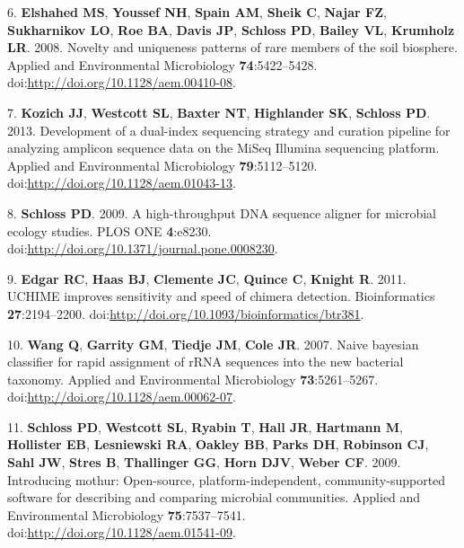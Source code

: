 \documentclass[11pt,]{article}
\begin{document}
6. \textbf{Elshahed MS}, \textbf{Youssef NH}, \textbf{Spain AM},
\textbf{Sheik C}, \textbf{Najar FZ}, \textbf{Sukharnikov LO},
\textbf{Roe BA}, \textbf{Davis JP}, \textbf{Schloss PD}, \textbf{Bailey
VL}, \textbf{Krumholz LR}. 2008. Novelty and uniqueness patterns of rare
members of the soil biosphere. Applied and Environmental Microbiology
\textbf{74}:5422--5428. doi:\url{http://doi.org/10.1128/aem.00410-08}.

7. \textbf{Kozich JJ}, \textbf{Westcott SL}, \textbf{Baxter NT},
\textbf{Highlander SK}, \textbf{Schloss PD}. 2013. Development of a
dual-index sequencing strategy and curation pipeline for analyzing
amplicon sequence data on the MiSeq Illumina sequencing platform.
Applied and Environmental Microbiology \textbf{79}:5112--5120.
doi:\url{http://doi.org/10.1128/aem.01043-13}.

8. \textbf{Schloss PD}. 2009. A high-throughput DNA sequence aligner for
microbial ecology studies. PLOS ONE \textbf{4}:e8230.
doi:\url{http://doi.org/10.1371/journal.pone.0008230}.

9. \textbf{Edgar RC}, \textbf{Haas BJ}, \textbf{Clemente JC},
\textbf{Quince C}, \textbf{Knight R}. 2011. UCHIME improves sensitivity
and speed of chimera detection. Bioinformatics \textbf{27}:2194--2200.
doi:\url{http://doi.org/10.1093/bioinformatics/btr381}.

10. \textbf{Wang Q}, \textbf{Garrity GM}, \textbf{Tiedje JM},
\textbf{Cole JR}. 2007. Naive bayesian classifier for rapid assignment
of rRNA sequences into the new bacterial taxonomy. Applied and
Environmental Microbiology \textbf{73}:5261--5267.
doi:\url{http://doi.org/10.1128/aem.00062-07}.

11. \textbf{Schloss PD}, \textbf{Westcott SL}, \textbf{Ryabin T},
\textbf{Hall JR}, \textbf{Hartmann M}, \textbf{Hollister EB},
\textbf{Lesniewski RA}, \textbf{Oakley BB}, \textbf{Parks DH},
\textbf{Robinson CJ}, \textbf{Sahl JW}, \textbf{Stres B},
\textbf{Thallinger GG}, \textbf{Horn DJV}, \textbf{Weber CF}. 2009.
Introducing mothur: Open-source, platform-independent,
community-supported software for describing and comparing microbial
communities. Applied and Environmental Microbiology
\textbf{75}:7537--7541. doi:\url{http://doi.org/10.1128/aem.01541-09}.
\end{document}
